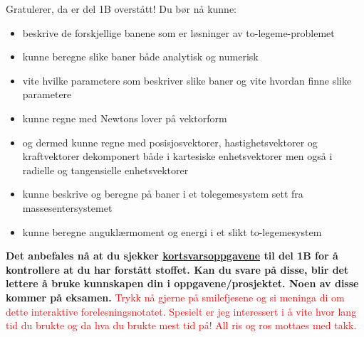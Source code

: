 \documentclass{beamer}
\let\hrefori\href
\renewcommand{\href}[2]{{\setlength{\fboxsep}{1pt}\colorbox{sunset}{\hrefori{#1}{#2}}}}
\newcommand{\pagebutton}[1]{\setbeamertemplate{button}{\tikz\node[inner xsep = 5pt, draw = structure!90, fill = green(ryb), rounded corners = 8pt]{\color{amber}\Large\insertbuttontext};}\beamerbutton{#1}}
\begin{document}
\begin{frame}
\label{oppsummering}
\hyperlink{koding3}{\pagebutton{\small Forrige side}}\href{https://nettskjema.no/a/158672}{ \Changey[1][yellow]{-2}}
Gratulerer, da er del 1B overstått! Du bør nå kunne:
\begin{itemize}
\item beskrive de forskjellige banene som er løsninger av to-legeme-problemet
\item kunne beregne slike baner både analytisk og numerisk
\item vite hvilke parametere som beskriver slike baner og vite hvordan finne slike parametere
\item kunne regne med Newtons lover på vektorform 
\item og dermed kunne regne med posisjosvektorer, hastighetsvektorer og kraftvektorer dekomponert både i kartesiske enhetsvektorer men også i radielle og tangensielle enhetsvektorer
\item kunne beskrive og beregne på baner i et tolegemesystem sett fra massesentersystemet
\item kunne beregne anguklærmoment og energi i et slikt to-legemesystem
\end{itemize}
    {\bf\footnotesize Det anbefales nå at du sjekker \href{https://www.uio.no/studier/emner/matnat/astro/AST2000/h21/undervisningsmateriell/kortsvarsoppgaver/del1b.pdf}{kortsvarsoppgavene} til del 1B for å kontrollere at du har forstått stoffet. Kan du svare på disse, blir det lettere å bruke kunnskapen din i oppgavene/prosjektet. Noen av disse kommer på eksamen.}
\textcolor{red}{\footnotesize Trykk nå gjerne på smilefjesene og si meninga di om dette interaktive forelesningsnotatet. Spesielt er jeg interessert i å vite hvor lang tid du brukte og da hva du brukte mest tid på! All ris og ros mottaes med takk.}
\end{frame}
\end{document}
